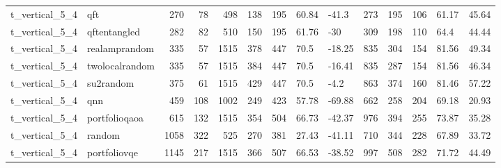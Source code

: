 \begin{longtable}{llrrrrlllrrlll}
t\_vertical\_5\_4 & qft & 270 & 78 & 498 & 138 & 195 & 60.84 & -41.3 & 273 & 195 & 106 & 61.17 & 45.64 \\
t\_vertical\_5\_4 & qftentangled & 282 & 82 & 510 & 150 & 195 & 61.76 & -30 & 309 & 198 & 110 & 64.4 & 44.44 \\
t\_vertical\_5\_4 & realamprandom & 335 & 57 & 1515 & 378 & 447 & 70.5 & -18.25 & 835 & 304 & 154 & 81.56 & 49.34 \\
t\_vertical\_5\_4 & twolocalrandom & 335 & 57 & 1515 & 384 & 447 & 70.5 & -16.41 & 835 & 287 & 154 & 81.56 & 46.34 \\
t\_vertical\_5\_4 & su2random & 375 & 61 & 1515 & 429 & 447 & 70.5 & -4.2 & 863 & 374 & 160 & 81.46 & 57.22 \\
t\_vertical\_5\_4 & qnn & 459 & 108 & 1002 & 249 & 423 & 57.78 & -69.88 & 662 & 258 & 204 & 69.18 & 20.93 \\
t\_vertical\_5\_4 & portfolioqaoa & 615 & 132 & 1515 & 354 & 504 & 66.73 & -42.37 & 976 & 394 & 255 & 73.87 & 35.28 \\
t\_vertical\_5\_4 & random & 1058 & 322 & 525 & 270 & 381 & 27.43 & -41.11 & 710 & 344 & 228 & 67.89 & 33.72 \\
t\_vertical\_5\_4 & portfoliovqe & 1145 & 217 & 1515 & 366 & 507 & 66.53 & -38.52 & 997 & 508 & 282 & 71.72 & 44.49 \\
\end{longtable}
